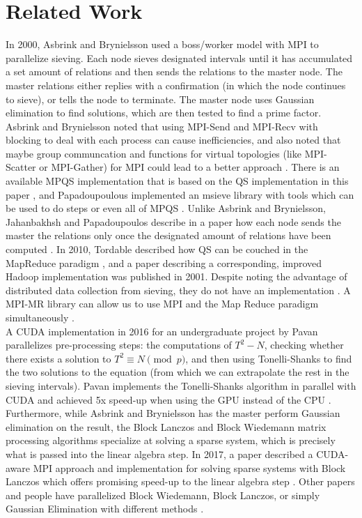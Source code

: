 \documentclass[11pt,twocolumn]{article}
\begin{document}
\section {Related Work}\label{rel}
In 2000, Asbrink and Brynielsson used a boss/worker model with MPI to parallelize sieving. Each node sieves designated intervals until it has accumulated a set amount of relations and then sends the relations to the master node. The master relations either replies with a confirmation (in which the node continues to sieve), or tells the node to terminate. The master node uses Gaussian elimination to find solutions, which are then tested to find a prime factor. Asbrink and Brynielsson noted that using MPI-Send and MPI-Recv  with blocking to deal with each process can cause inefficiencies, and also noted that maybe group communcation and functions for virtual topologies (like MPI-Scatter or MPI-Gather) for MPI could lead to a better approach \cite{asbrink:parallelqs}. There is an available MPQS implementation that is based on the QS implementation in this paper \cite{bytopia:help}, and Papadoupoulous implemented an msieve library with tools which can be used to do steps or even all of MPQS \cite{papadopoulos:msieve}. Unlike Asbrink and Brynielsson, Jahanbakhsh and Papadoupoulos describe in a paper how each node sends the master the relations only once the designated amount of relations have been computed \cite{jahenbaksh:mpiQS}. In 2010, Tordable described how QS can be couched in the MapReduce paradigm \cite{tordable:intmapreduce}, and a paper describing a corresponding, improved Hadoop implementation was published in 2001. Despite noting the advantage of distributed data collection from sieving, they do not have an implementation \cite{nguyen:hadoop}. A MPI-MR library can allow us to use MPI and the Map Reduce paradigm simultaneously \cite{plimpton:mpimr}. \\
\indent A CUDA implementation in 2016 for an undergraduate project by Pavan parallelizes pre-processing steps: the computations of $T^2 - N$, checking whether there exists a solution to $T^2 \equiv N \pmod{p}$, and then using Tonelli-Shanks to find the two solutions to the equation (from which we can extrapolate the rest in the sieving intervals). Pavan implements the Tonelli-Shanks algorithm in parallel with CUDA and achieved 5x speed-up when using the GPU instead of the CPU \cite{pavan:parallelgpu}.  Furthermore, while Asbrink and Brynielsson has the master perform Gaussian elimination on the result, the Block Lanczos and Block Wiedemann matrix processing algorithms specialize at solving a sparse system, which is precisely what is passed into the linear algebra step. In 2017, a paper described a CUDA-aware MPI approach and implementation for solving sparse systems with Block Lanczos which offers promising speed-up to the linear algebra step \cite{verma:cudampilanczos}. Other papers and people have parallelized Block Wiedemann, Block Lanczos, or simply Gaussian Elimination with different methods \cite{flesch:lanczos} \cite{cohen:gaussian} \cite{wozniak:lanczos}.
\end{document}
